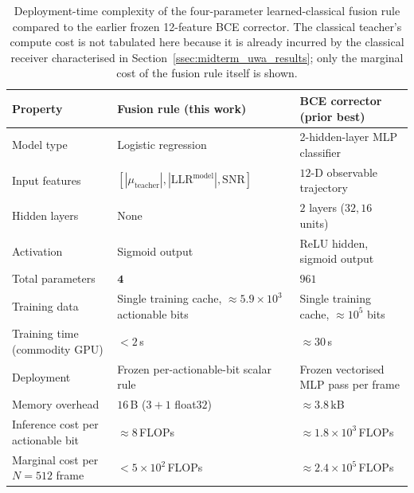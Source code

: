 \begin{table}[t]
\centering
\caption{Deployment-time complexity of the four-parameter learned-classical fusion rule compared to the earlier frozen 12-feature BCE corrector.  The classical teacher's compute cost is not tabulated here because it is already incurred by the classical receiver characterised in Section~\ref{ssec:midterm_uwa_results}; only the marginal cost of the fusion rule itself is shown.}
\label{tab:fyp_complexity}
\setlength{\tabcolsep}{5pt}
\begin{tabular}{lll}
\toprule
\textbf{Property} & \textbf{Fusion rule (this work)} & \textbf{BCE corrector (prior best)} \\
\midrule
Model type & Logistic regression & 2-hidden-layer MLP classifier \\
Input features & $[|\mu_\mathrm{teacher}|, |\mathrm{LLR}^\mathrm{model}|, \mathrm{SNR}]$ & $12$-D observable trajectory \\
Hidden layers & None & $2$ layers ($32, 16$ units) \\
Activation & Sigmoid output & ReLU hidden, sigmoid output \\
Total parameters & $\mathbf{4}$ & $961$ \\
Training data & Single training cache, $\approx 5.9 \times 10^{3}$ actionable bits & Single training cache, $\approx 10^{5}$ bits \\
Training time (commodity GPU) & $< 2$\,s & $\approx 30$\,s \\
Deployment & Frozen per-actionable-bit scalar rule & Frozen vectorised MLP pass per frame \\
Memory overhead & $16$\,B ($3 + 1$ float$32$) & $\approx 3.8$\,kB \\
Inference cost per actionable bit & $\approx 8$\,FLOPs & $\approx 1.8 \times 10^{3}$\,FLOPs \\
Marginal cost per $N = 512$ frame & $< 5 \times 10^{2}$\,FLOPs & $\approx 2.4 \times 10^{5}$\,FLOPs \\
\bottomrule
\end{tabular}
\end{table}
